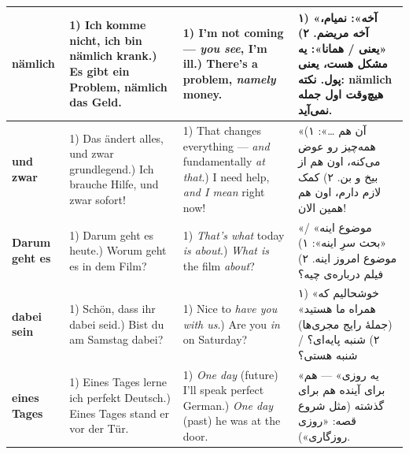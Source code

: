 \documentclass[10pt]{article}
\newcommand{\w}[1]{\textbf{#1}}
\newcommand{\en}[1]{\beginL #1\endL}
\begin{document}
\begin{longtable}{|L{3.4cm}|L{8.6cm}|L{6.6cm}|F{6.3cm}|}
\w{nämlich} &
1) Ich komme nicht, ich bin nämlich krank.) Es gibt ein Problem, nämlich das Geld. &
1) I’m not coming — \emph{you see}, I’m ill.) There’s a problem, \emph{namely} money. &
۱) «آخه»: نمیام، آخه مریضم.\newline
۲) «یعنی / همانا»: یه مشکل هست، یعنی پول.\newline
نکته: \en{nämlich} هیچ‌وقت اول جمله نمی‌آید. \\\hline

\w{und zwar} &
1) Das ändert alles, und zwar grundlegend.) Ich brauche Hilfe, und zwar sofort! &
1) That changes everything — \emph{and} fundamentally \emph{at that}.) I need help, \emph{and I mean} right now! &
«آن هم …»:\newline
۱) همه‌چیز رو عوض می‌کنه، اون هم از بیخ و بن.\newline
۲) کمک لازم دارم، اون هم همین الان! \\\hline

\w{Darum geht es} &
1) Darum geht es heute.) Worum geht es in dem Film? &
1) \emph{That’s what} today \emph{is about}.) \emph{What is} the film \emph{about}? &
«موضوع اینه» / «بحث سرِ اینه»:\newline
۱) موضوع امروز اینه.\newline
۲) فیلم درباره‌ی چیه؟ \\\hline

\w{dabei sein} &
1) Schön, dass ihr dabei seid.) Bist du am Samstag dabei? &
1) Nice to \emph{have you with us}.) Are you \emph{in} on Saturday? &
۱) «خوشحالیم که همراه ما هستید» (جملهٔ رایج مجری‌ها)\newline
۲) شنبه پایه‌ای؟ / شنبه هستی؟ \\\hline

\w{eines Tages} &
1) Eines Tages lerne ich perfekt Deutsch.) Eines Tages stand er vor der Tür. &
1) \emph{One day} (future) I’ll speak perfect German.) \emph{One day} (past) he was at the door. &
«یه روزی» — هم برای آینده هم برای گذشته (مثل شروع قصه: «روزی روزگاری»). \\\hline


\end{longtable}
\end{document}
